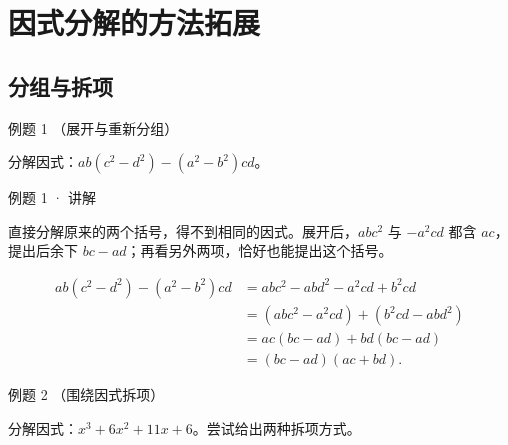 \section{因式分解的方法拓展}


\subsection{分组与拆项}



\begin{problem}{例题 1 （展开与重新分组）}

分解因式：$ab(c^2-d^2)-(a^2-b^2)cd$。

\end{problem}


\begin{solution}{例题 1 · 讲解}

\think 直接分解原来的两个括号，得不到相同的因式。展开后，$abc^2$ 与 $-a^2cd$ 都含 $ac$，提出后余下 $bc-ad$；再看另外两项，恰好也能提出这个括号。

\solve \begin{align*}
ab(c^2-d^2)-(a^2-b^2)cd
&=abc^2-abd^2-a^2cd+b^2cd\\
&=(abc^2-a^2cd)+(b^2cd-abd^2)\\
&=ac(bc-ad)+bd(bc-ad)\\
&=(bc-ad)(ac+bd).
\end{align*}


\end{solution}


\begin{problem}{例题 2 （围绕因式拆项）}

分解因式：$x^3+6x^2+11x+6$。尝试给出两种拆项方式。

\end{problem}


